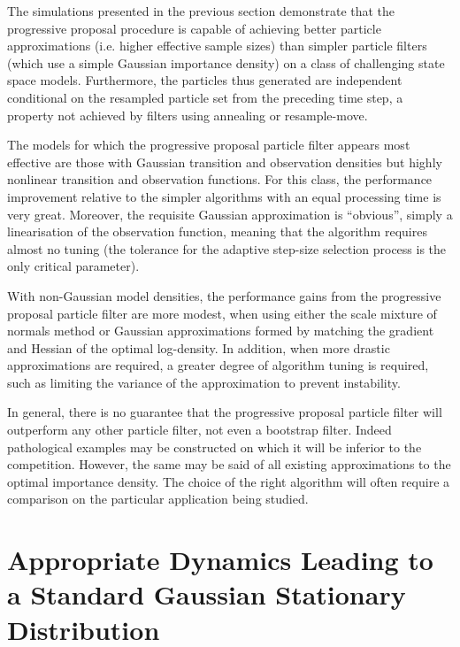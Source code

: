 \documentclass{article}
\begin{document}
The simulations presented in the previous section demonstrate that the progressive proposal procedure is capable of achieving better particle approximations (i.e. higher effective sample sizes) than simpler particle filters (which use a simple Gaussian importance density) on a class of challenging state space models. Furthermore, the particles thus generated are independent conditional on the resampled particle set from the preceding time step, a property not achieved by filters using annealing or resample-move.

The models for which the progressive proposal particle filter appears most effective are those with Gaussian transition and observation densities but highly nonlinear transition and observation functions. For this class, the performance improvement relative to the simpler algorithms with an equal processing time is very great. Moreover, the requisite Gaussian approximation is ``obvious'', simply a linearisation of the observation function, meaning that the algorithm requires almost no tuning (the tolerance for the adaptive step-size selection process is the only critical parameter).

With non-Gaussian model densities, the performance gains from the progressive proposal particle filter are more modest, when using either the scale mixture of normals method or Gaussian approximations formed by matching the gradient and Hessian of the optimal log-density. In addition, when more drastic approximations are required, a greater degree of algorithm tuning is required, such as limiting the variance of the approximation to prevent instability.

In general, there is no guarantee that the progressive proposal particle filter will outperform any other particle filter, not even a bootstrap filter. Indeed pathological examples may be constructed on which it will be inferior to the competition. However, the same may be said of all existing approximations to the optimal importance density. The choice of the right algorithm will often require a comparison on the particular application being studied.



\appendix

\section{Appropriate Dynamics Leading to a Standard Gaussian Stationary Distribution} \label{app:stationary_ou_process}
\end{document}
